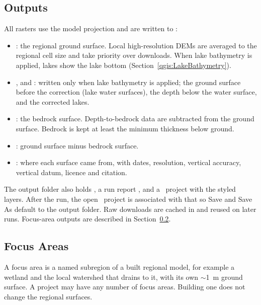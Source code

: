     \subsection{Outputs}
        All rasters use the model projection and are written to :
        \begin{itemize}
        \item {}: the regional ground surface.  Local high-resolution DEMs are averaged to the regional cell size and take priority over downloads.  When lake bathymetry is applied, lakes show the lake bottom (Section~\ref{qgis:LakeBathymetry}).
        \item {},  and : written only when lake bathymetry is applied; the ground surface before the correction (lake water surfaces), the depth below the water surface, and the corrected lakes.
        \item {}: the bedrock surface.  Depth-to-bedrock data are subtracted from the ground surface.  Bedrock is kept at least the minimum thickness below ground.
        \item {}: ground surface minus bedrock surface.
        \item {}: where each surface came from, with dates, resolution, vertical accuracy, vertical datum, licence and citation.
        \end{itemize}
        The output folder also holds , a run report , and a \qgis\ project  with the styled layers.  After the run, the open \qgis\ project is associated with that  so {\sf Save} and {\sf Save As} default to the output folder.  Raw downloads are cached in  and reused on later runs.  Focus-area outputs are described in Section~\ref{qgis:FocusAreas}.

    \subsection{Focus Areas}
        \label{qgis:FocusAreas} 
        A focus area is a named subregion of a built regional model, for example a wetland and the local watershed that drains to it, with its own $\sim$1~m ground surface.  A project may have any number of focus areas.  Building one does not change the regional surfaces.

